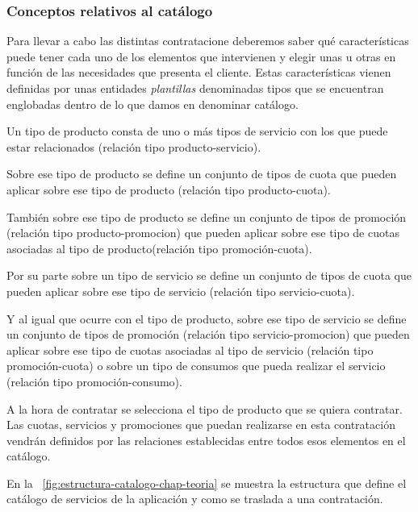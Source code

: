 \subsubsection{Conceptos relativos al catálogo}
\label{sub:catálogo-conceptos-chap-teoria}


Para llevar a cabo las distintas contratacione deberemos saber qué características puede tener cada uno de los elementos que intervienen y elegir unas u otras en función de las necesidades que presenta el cliente. Estas características vienen definidas por unas entidades \textit{plantillas} denominadas tipos que se encuentran englobadas dentro de lo que damos en denominar catálogo. 


Un tipo de producto consta de uno o más tipos de servicio con los que puede estar relacionados (relación tipo producto-servicio). 

Sobre ese tipo de producto se define un conjunto de tipos de cuota que pueden aplicar sobre ese tipo de producto (relación tipo producto-cuota).

También sobre ese tipo de producto se define un conjunto de tipos de promoción (relación tipo producto-promocion) que pueden aplicar sobre ese tipo de cuotas asociadas al tipo de producto(relación tipo promoción-cuota).

Por su parte sobre un tipo de servicio se define un conjunto de tipos de cuota que pueden aplicar sobre ese tipo de servicio (relación tipo servicio-cuota).

Y al igual que ocurre con el tipo de producto, sobre ese tipo de servicio se define un conjunto de tipos de promoción (relación tipo servicio-promocion) que pueden aplicar sobre ese tipo de cuotas asociadas al tipo de servicio (relación tipo promoción-cuota) o sobre un tipo de consumos que pueda realizar el servicio (relación tipo promoción-consumo).

A la hora de contratar se selecciona el tipo de producto que se quiera contratar. Las cuotas, servicios y promociones que puedan realizarse en esta contratación vendrán definidos por las relaciones establecidas entre todos esos elementos en el catálogo.


En la \figurename~\ref{fig:estructura-catalogo-chap-teoria} se muestra la estructura que define el catálogo de servicios de la aplicación y como se traslada a una contratación.

